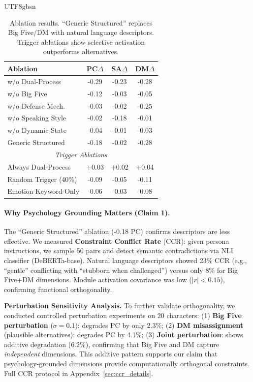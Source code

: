\documentclass[11pt]{article}
\begin{document}
\begin{CJK*}{UTF8}{gbsn}
\begin{table}[t]
\centering
\small
\begin{tabular}{lccc}
\toprule
\textbf{Ablation} & \textbf{PC}$\Delta$ & \textbf{SA}$\Delta$ & \textbf{DM}$\Delta$ \\
\midrule
w/o Dual-Process & -0.29 & -0.23 & -0.28 \\
w/o Big Five & -0.12 & -0.03 & -0.05 \\
w/o Defense Mech. & -0.03 & -0.02 & -0.25 \\
w/o Speaking Style & -0.02 & -0.18 & -0.01 \\
w/o Dynamic State & -0.04 & -0.01 & -0.03 \\
Generic Structured & -0.18 & -0.02 & -0.28 \\
\midrule
\multicolumn{4}{c}{\textit{Trigger Ablations}} \\
\midrule
Always Dual-Process & +0.03 & +0.02 & +0.04 \\
Random Trigger (40\%) & -0.09 & -0.05 & -0.11 \\
Emotion-Keyword-Only & -0.06 & -0.03 & -0.08 \\
\bottomrule
\end{tabular}
\caption{Ablation results. ``Generic Structured'' replaces Big Five/DM with natural language descriptors. Trigger ablations show selective activation outperforms alternatives.}
\label{tab:ablation}
\end{table}

\paragraph{Why Psychology Grounding Matters (Claim 1).} The ``Generic Structured'' ablation (-0.18 PC) confirms descriptors are less effective. We measured \textbf{Constraint Conflict Rate} (CCR): given persona instructions, we sample 50 pairs and detect semantic contradictions via NLI classifier (DeBERTa-base). Natural language descriptors showed 23\% CCR (e.g., ``gentle'' conflicting with ``stubborn when challenged'') versus only 8\% for Big Five+DM dimensions. Module activation covariance was low ($|r| < 0.15$), confirming functional orthogonality.

\textbf{Perturbation Sensitivity Analysis.} To further validate orthogonality, we conducted controlled perturbation experiments on 20 characters: (1) \textbf{Big Five perturbation} ($\sigma=0.1$): degrades PC by only 2.3\%; (2) \textbf{DM misassignment} (plausible alternatives): degrades PC by 4.1\%; (3) \textbf{Joint perturbation}: shows additive degradation (6.2\%), confirming that Big Five and DM capture \textit{independent} dimensions. This additive pattern supports our claim that psychology-grounded dimensions provide computationally orthogonal constraints. Full CCR protocol in Appendix~\ref{sec:ccr_details}.


\end{CJK*}
\end{document}
